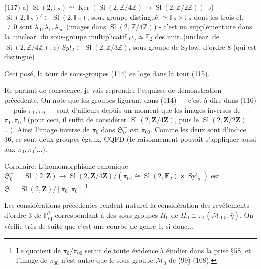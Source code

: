 (117)
a) $\operatorname{Sl}(2, \mathbb{F}_2) \simeq \operatorname{Ker}(\operatorname{Sl}(2, \mathbb{Z}/4\mathbb{Z}) \to \operatorname{Sl}(2, \mathbb{Z}/2\mathbb{Z}))$
b) $\operatorname{Sl}(2, \mathbb{F}_2)' \subset \operatorname{Sl}(2, \mathbb{F}_2)$, sous-groupe distingué $\simeq \mathbb{F}_2 \times \mathbb{F}_2$ dont les trois él. $\neq 0$ sont $\lambda_0, \lambda_1, \lambda_\infty$ (images dans $\operatorname{Sl}(2, \mathbb{Z}/4\mathbb{Z})$) - c'est un supplémentaire dans la [unclear] du sous-groupe multiplicatif $\mu_2 \simeq \mathbb{F}_2$ des unit. [unclear] de $\operatorname{Sl}(2, \mathbb{Z}/4\mathbb{Z})$.
c) $Syl_2 \subset \operatorname{Sl}(2, \mathbb{Z}/3\mathbb{Z})$, sous-groupe de Sylow, d'ordre 8 (qui est distingué)

\newpage


Ceci posé, la tour de sous-groupes (114) se loge dans la tour (115).

Re-parlant de conscience, je vais reprendre l'esquisse de démonstration précédente. On note que les groupes figurant dans (114) — c'est-à-dire dans (116) — puis $\pi_1, \pi_0$ — sont d'ailleurs depuis un moment que les images inverses de $\pi_1, \pi_0$ ! (pour ceci, il suffit de considérer $\operatorname{Sl}(2, \mathbf{Z}/4\mathbf{Z})$, puis le $\operatorname{Sl}(2, \mathbf{Z}/2\mathbf{Z})$ ...).
Ainsi l'image inverse de $\pi_0$ dans $\mathfrak{S}^+_0$ est $\pi_{00}$. Comme les deux sont d'indice 36, ce sont deux groupes égaux, CQFD (le raisonnement pouvait s'appliquer aussi aux $\pi_0, \pi_0' \dots$).

Corollaire: L'homomorphisme canonique $\mathfrak{S}^+_0 = \operatorname{Sl}(2, \mathbf{Z}) \to \operatorname{Sl}(2, \mathbf{Z}/4\mathbf{Z}) / (\pi_{00} \cong \operatorname{Sl}(2, \mathbf{F}_2) \times \operatorname{Syl}_2)$ est $\mathfrak{S} = \operatorname{Sl}(2, \mathbf{Z}) / [\pi_0, \pi_0]$ \footnote{Le quotient de $\pi_0/\pi_{00}$ serait de toute évidence à étudier dans la prise $§ 58$, et l'image de $\pi_{00}$ n'est autre que le sous-groupe $\mathcal{M}_0$ de (99) (108).}

\newpage


Les considérations précédentes rendent naturel la considération des revêtements d'ordre 3 de $\mathbb{P}^1_{\overline{\mathbf{Q}}}$ correspondant à des sous-groupes $\Pi_0$ de $\Pi_0 \cong \pi_1(\mathcal{M}_{0,3}, \bar{\eta})$.
On vérifie très de suite que c'est une courbe de genre 1, si donc...

